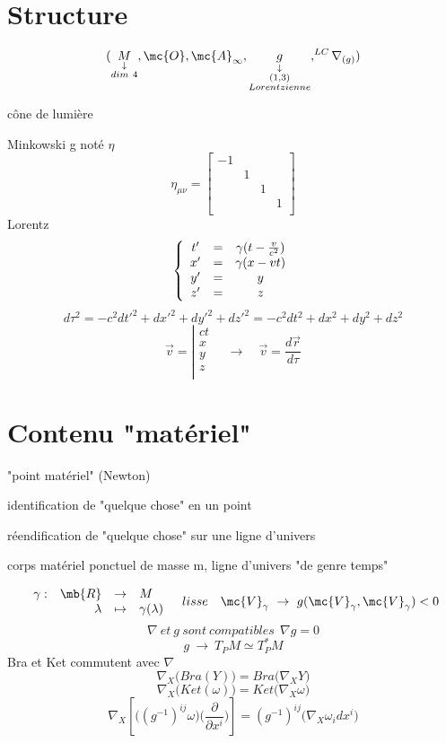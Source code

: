 \section{Structure}

\[
(\underset{\substack{\downarrow \\ dim\ 4}}{M}, \mc{O}, \mc{A}_\infty,
\underset{\substack{\downarrow \\ (1,3) \\ Lorentzienne}}{g}, ^{LC}\nabla_{(g)})
\]

cône de lumière

Minkowski g noté $\eta$
\[
\eta_{\mu\nu}=
\left[
  \begin{array}{cccc}
    -1 &  &  &  \\
     & 1 &  &  \\
     &  & 1 &  \\
     &  &  & 1 \\
  \end{array}
  \right]
\]
Lorentz
\[
\left\{
\begin{array}{ c c c }
 t' & = & \gamma(t-\frac{v}{c^2}) \\
 x' & = & \gamma(x-vt) \\
 y' & = & y \\
 z' & = & z \\
\end{array}
\right .
\]
\[
d\tau^2 = -c^2dt'^2+dx'^2+dy'^2+dz'^2 = -c^2dt^2+dx^2+dy^2+dz^2
\]
\[
\vec v = \left|
\begin{array}{ c }
 ct \\
 x \\
 y \\
 z \\
\end{array}
\right . \quad \to \quad \vec v = \frac{d\vec r}{d\tau}
\]
\section{Contenu "matériel"}
"point matériel" (Newton)

identification de "quelque chose" en un point

réendification de "quelque chose" sur une ligne d'univers

corps matériel ponctuel de masse m, ligne d'univers "de genre temps"

\[
\begin{array}{ c r c l }
 \gamma : & \mb{R} & \to & M \\
  & \lambda & \mapsto & \gamma(\lambda) \\
\end{array}
\quad lisse \quad
\mc{V}_\gamma\ \to\ g(\mc{V}_\gamma,\mc{V}_\gamma)<0
\]
\[
\nabla\ et\ g\ sont\ compatibles\ \ \boxed{\nabla g=0}
\]
\[
g \ \to\ T_PM \simeq T^*_PM
\]
Bra et Ket commutent avec $\nabla$
\[
\nabla_X\big(Bra(Y)\big)=Bra\big(\nabla_XY\big)
\]
\[
\nabla_X\big(Ket(\omega)\big)=Ket\big(\nabla_X\omega\big)
\]
\[
\nabla_X\left[\big((g^{-1})^{ij}\omega\big)\big(\frac{\partial}{\partial x^i}
\big)\right]=(g^{-1})^{ij}\big(\nabla_X\omega_idx^i\big)
\]
